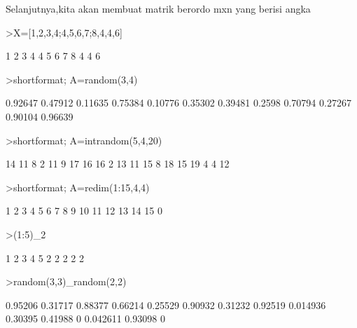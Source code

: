 \documentclass[a4paper,10pt]{article}
\begin{document}
\begin{eulernotebook}
\begin{eulercomment}
\begin{eulercomment}
\begin{eulercomment}
\begin{eulercomment}
\begin{eulercomment}
\begin{eulercomment}
\begin{eulercomment}
\begin{eulercomment}
\begin{eulercomment}
\begin{eulercomment}
\begin{eulercomment}
Selanjutnya,kita akan membuat matrik berordo mxn yang berisi angka
\end{eulercomment}
\begin{eulerprompt}
>X=[1,2,3,4;4,5,6,7;8,4,4,6]
\end{eulerprompt}
\begin{euleroutput}
              1             2             3             4 
              4             5             6             7 
              8             4             4             6 
\end{euleroutput}
\begin{eulerprompt}
>shortformat; A=random(3,4)
\end{eulerprompt}
\begin{euleroutput}
    0.92647   0.47912   0.11635   0.75384 
    0.10776   0.35302   0.39481    0.2598 
    0.70794   0.27267   0.90104   0.96639 
\end{euleroutput}
\begin{eulerprompt}
>shortformat; A=intrandom(5,4,20)
\end{eulerprompt}
\begin{euleroutput}
         14        11         8         2 
         11         9        17        16 
         16         2        13        11 
         15         8        18        15 
         19         4         4        12 
\end{euleroutput}
\begin{eulerprompt}
>shortformat; A=redim(1:15,4,4)
\end{eulerprompt}
\begin{euleroutput}
          1         2         3         4 
          5         6         7         8 
          9        10        11        12 
         13        14        15         0 
\end{euleroutput}
\begin{eulerprompt}
>(1:5)_2
\end{eulerprompt}
\begin{euleroutput}
          1         2         3         4         5 
          2         2         2         2         2 
\end{euleroutput}
\begin{eulerprompt}
>random(3,3)_random(2,2)
\end{eulerprompt}
\begin{euleroutput}
    0.95206   0.31717   0.88377 
    0.66214   0.25529   0.90932 
    0.31232   0.92519  0.014936 
    0.30395   0.41988         0 
   0.042611   0.93098         0 

\end{euleroutput}
\end{eulercomment}
\end{eulercomment}
\end{eulercomment}
\end{eulercomment}
\end{eulercomment}
\end{eulercomment}
\end{eulercomment}
\end{eulercomment}
\end{eulercomment}
\end{eulercomment}
\end{eulernotebook}
\end{document}
